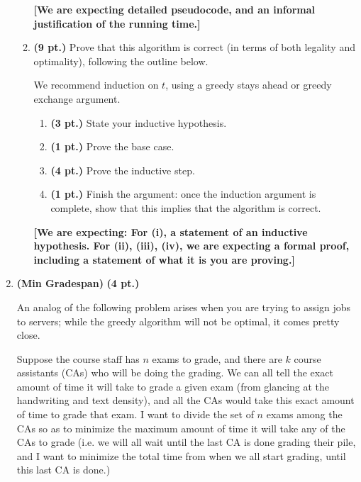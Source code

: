 \documentclass{article}
\begin{document}
\begin{enumerate}
\begin{enumerate}
        \textbf{[We are expecting detailed pseudocode, and an informal
        justification of the running time.]}

      \item \textbf{(9 pt.)} Prove that this algorithm is correct (in terms of
        both legality and optimality), following the outline below.

        We recommend induction on $t$, using a greedy stays ahead or greedy
        exchange argument.

        \begin{enumerate}
          \item \textbf{(3 pt.)} State your inductive hypothesis.
          \item \textbf{(1 pt.)} Prove the base case.
          \item \textbf{(4 pt.)} Prove the inductive step. 
          \item \textbf{(1 pt.)} Finish the argument: once the induction
            argument is complete, show that this implies that the algorithm is
            correct.
        \end{enumerate}

        \textbf{[We are expecting: For (i), a statement of an inductive
          hypothesis. For (ii), (iii), (iv), we are expecting a formal proof,
          including a statement of what it is you are proving.]}
    \end{enumerate}
  \item \textbf{(Min Gradespan)} \textbf{(4 pt.)}

    An analog of the following problem arises when you are trying to assign
    jobs to servers; while the greedy algorithm will not be optimal, it comes
    pretty close.

    Suppose the course staff has $n$ exams to grade, and there are $k$ course
    assistants (CAs) who will be doing the grading. We can all tell the exact
    amount of time it will take to grade a given exam (from glancing at the
    handwriting and text density), and all the CAs would take this exact amount
    of time to grade that exam. I want to divide the set of $n$ exams among the
    CAs so as to minimize the maximum amount of time it will take any of the
    CAs to grade (i.e. we will all wait until the last CA is done grading their
    pile, and I want to minimize the total time from when we all start grading,
    until this last CA is done.)


\end{enumerate}
\end{document}
